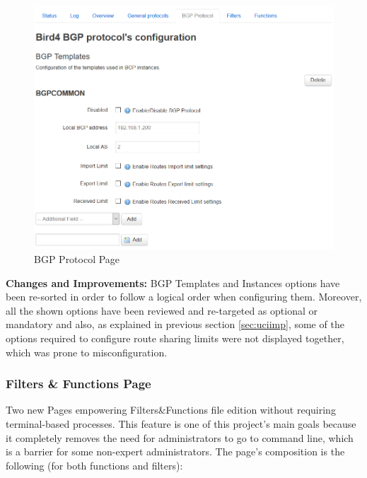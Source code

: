 \begin{figure}[H]
    \centering
    \includegraphics[width=\textwidth]{images/bird0.3/bgp}
    \caption{BGP Protocol Page}
    \label{fig:bgpp}
\end{figure}

\textbf{Changes and Improvements:}
BGP Templates and Instances options have been re-sorted in order to follow a logical order when configuring them. Moreover, all the shown options have been reviewed and re-targeted as optional or mandatory and also, as explained in previous section \ref{sec:uciimp}, some of the options required to configure route sharing limits were not displayed together, which was prone to misconfiguration.

\subsubsection{Filters \& Functions Page}
Two new Pages empowering Filters\&Functions file edition without requiring terminal-based processes. This feature is one of this project's main goals because it completely removes the need for administrators to go to command line, which is a barrier for some non-expert administrators. The page's composition is the following (for both functions and filters):

